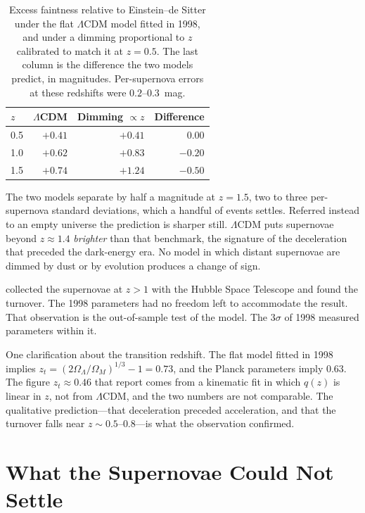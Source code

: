 \documentclass[12pt]{article}
\begin{document}
\begin{table}[ht]
\centering
\caption{Excess faintness relative to Einstein--de Sitter under the flat
$\Lambda$CDM model fitted in 1998, and under a dimming proportional to $z$
calibrated to match it at $z = 0.5$.  The last column is the difference the
two models predict, in magnitudes.  Per-supernova errors at these redshifts
were $0.2$--$0.3$~mag.}
\label{tab:prediction}
\medskip
\begin{tabular}{lrrr}
\toprule
$z$ & $\Lambda$CDM & Dimming $\propto z$ & Difference \\
\midrule
0.5 & $+0.41$ & $+0.41$ & $0.00$ \\
1.0 & $+0.62$ & $+0.83$ & $-0.20$ \\
1.5 & $+0.74$ & $+1.24$ & $-0.50$ \\
\bottomrule
\end{tabular}
\end{table}

The two models separate by half a magnitude at $z = 1.5$, two to three
per-supernova standard deviations, which a handful of events settles.
Referred instead to an empty universe the prediction is sharper still.
$\Lambda$CDM puts supernovae beyond $z \approx 1.4$ \emph{brighter} than that
benchmark, the signature of the deceleration that preceded the dark-energy
era.  No model in which distant supernovae are dimmed by dust or by evolution
produces a change of sign.

\citet{Riess2004} collected the supernovae at $z > 1$ with the Hubble Space
Telescope and found the turnover.  The 1998 parameters had no freedom left to
accommodate the result.  That observation is the out-of-sample test of the
model.  The $3\sigma$ of 1998 measured parameters within it.

One clarification about the transition redshift.  The flat model fitted in
1998 implies $z_t = (2\Omega_\Lambda/\Omega_M)^{1/3} - 1 = 0.73$, and the
Planck parameters imply $0.63$.  The figure $z_t \approx 0.46$ that
\citet{Riess2004} report comes from a kinematic fit in which $q(z)$ is linear
in $z$, not from $\Lambda$CDM, and the two numbers are not comparable.  The
qualitative prediction---that deceleration preceded acceleration, and that the
turnover falls near $z \sim 0.5$--$0.8$---is what the observation confirmed.

\section{What the Supernovae Could Not Settle}
\label{sec:limits}
\end{document}

